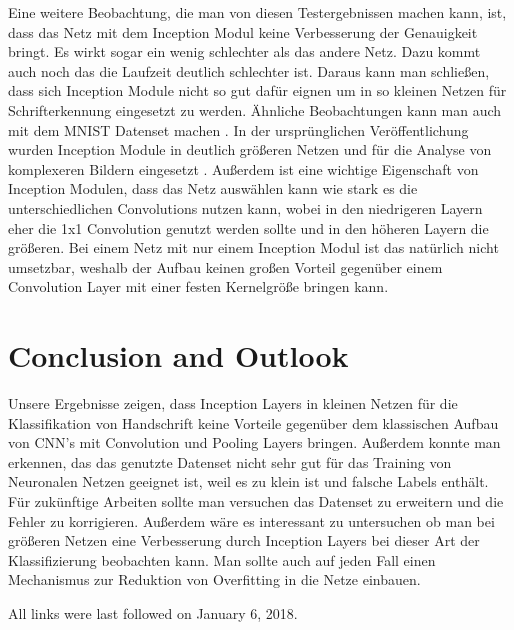 \documentclass[runningheads,a4paper]{llncs}[2015/06/24]
\begin{document}
Eine weitere Beobachtung, die man von diesen Testergebnissen machen kann, ist, dass das Netz mit dem Inception Modul keine Verbesserung der Genauigkeit bringt. Es wirkt sogar ein wenig schlechter als das andere Netz. Dazu kommt auch noch das die Laufzeit deutlich schlechter ist. Daraus kann man schließen, dass sich Inception Module nicht so gut dafür eignen um in so kleinen Netzen für Schrifterkennung eingesetzt zu werden. Ähnliche Beobachtungen kann man auch mit dem MNIST Datenset machen \cite{inception_blog}. In der ursprünglichen Veröffentlichung wurden Inception Module in deutlich größeren Netzen und für die Analyse von komplexeren Bildern eingesetzt \cite{inception_paper}. Außerdem ist eine wichtige Eigenschaft von Inception Modulen, dass das Netz auswählen kann wie stark es die unterschiedlichen Convolutions nutzen kann, wobei in den niedrigeren Layern eher die 1x1 Convolution genutzt werden sollte und in den höheren Layern die größeren. Bei einem Netz mit nur einem Inception Modul ist das natürlich nicht umsetzbar, weshalb der Aufbau keinen großen Vorteil gegenüber einem Convolution Layer mit einer festen Kernelgröße bringen kann.

\section{Conclusion and Outlook}
Unsere Ergebnisse zeigen, dass Inception Layers in kleinen Netzen für die Klassifikation von Handschrift keine Vorteile gegenüber dem klassischen Aufbau von CNN's mit Convolution und Pooling Layers bringen. Außerdem konnte man erkennen, das das genutzte Datenset nicht sehr gut für das Training von Neuronalen Netzen geeignet ist, weil es zu klein ist und falsche Labels enthält.\\
Für zukünftige Arbeiten sollte man versuchen das Datenset zu erweitern und die Fehler zu korrigieren. Außerdem wäre es interessant zu untersuchen ob man bei größeren Netzen eine Verbesserung durch Inception Layers bei dieser Art der Klassifizierung beobachten kann. Man sollte auch auf jeden Fall einen Mechanismus zur Reduktion von Overfitting in die Netze einbauen.






All links were last followed on January 6, 2018.
\end{document}

